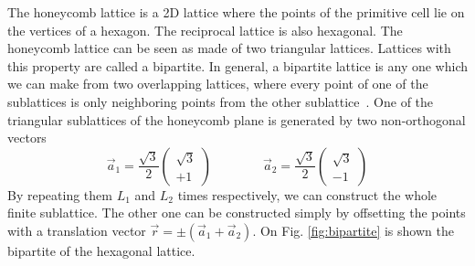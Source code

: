 The honeycomb lattice is a 2D lattice where the points of the primitive cell lie on the vertices of a hexagon. The reciprocal lattice is also hexagonal. The honeycomb lattice can be seen as made of two triangular lattices. Lattices with this property are called a bipartite. In general, a bipartite lattice is any one which we can make from two overlapping lattices, where every point of one of the sublattices is only neighboring points from the other sublattice~\cite{graphhmc}. One of the triangular sublattices of the honeycomb plane is generated by two non-orthogonal vectors
\begin{equation}
  \vec{a}_1 = \frac{\sqrt{3}}{2}
  \begin{pmatrix}
    \sqrt{3} \\
    +1
  \end{pmatrix} \qquad \qquad
  \vec{a}_2 = \frac{\sqrt{3}}{2}
  \begin{pmatrix}
    \sqrt{3} \\
    -1
  \end{pmatrix}
\end{equation}
By repeating them $L_1$ and $L_2$ times respectively, we can construct the whole finite sublattice. The other one can be constructed simply by offsetting the points with a translation vector $\vec{r} = \pm(\vec{a}_1 + \vec{a}_2)$. On Fig. \ref{fig:bipartite} is shown the bipartite of the hexagonal lattice.
